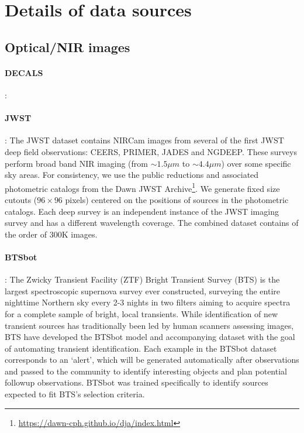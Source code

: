 
\section{Details of data sources}
\label{sec:data_source}

\subsection{Optical/NIR images}

\paragraph{DECALS}: 
\paragraph{JWST}: The JWST dataset contains NIRCam images from several of the first JWST deep field observations: CEERS, PRIMER, JADES and NGDEEP. These surveys perform broad band NIR imaging (from $\sim1.5\mu m$ to $\sim4.4\mu m$) over some specific sky areas. For consistency, we use the public reductions and associated photometric catalogs from the Dawn JWST Archive\footnote{\url{https://dawn-cph.github.io/dja/index.html}}. We generate fixed size cutouts ($96\times96$ pixels) centered on the positions of sources in the photometric catalogs. Each deep survey is an independent instance of the JWST imaging survey and has a different wavelength coverage. The combined dataset contains of the order of 300K images.

\paragraph{BTSbot}: The Zwicky Transient Facility (ZTF) \cite{Bellm19a, Bellm19b} Bright Transient Survey (BTS) \citep{Fremling20, Perley20} is the largest spectroscopic supernova survey ever constructed, surveying the entire nighttime Northern sky every 2-3 nights in two filters aiming to acquire spectra for a complete sample of bright, local transients. While identification of new transient sources has traditionally been led by human scanners assessing images, BTS have developed the BTSbot model and accompanying dataset \cite{BTSbot_2024} with the goal of automating transient identification. Each example in the BTSbot dataset corresponds to an `alert', which will be generated automatically after observations and passed to the community to identify interesting objects and plan potential followup observations. BTSbot was trained specifically to identify sources expected to fit BTS's selection criteria.


